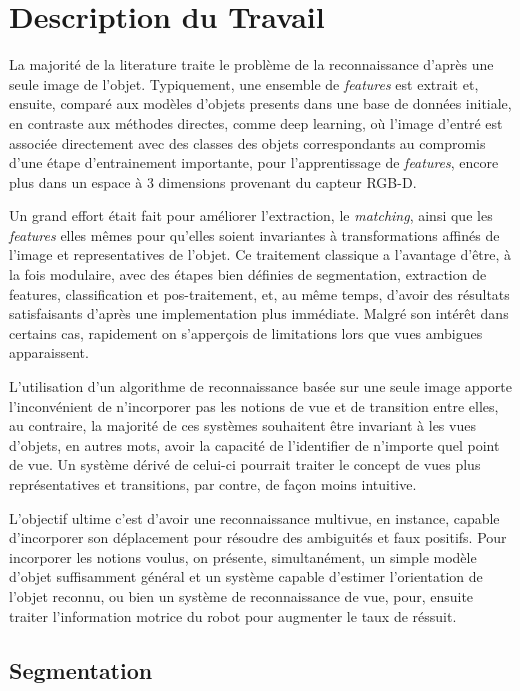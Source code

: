 
\chapter{Description du Travail}

La majorité de la literature traite le problème de la reconnaissance d'après une seule image de l'objet. Typiquement, une ensemble de \textit{features} est extrait et, ensuite, comparé aux modèles d'objets presents dans une base de données initiale, en contraste aux méthodes directes, comme deep learning, où l'image d'entré est
associée directement avec des classes des objets correspondants au
compromis d'une étape d'entrainement importante, pour l'apprentissage
de \textit{features}, encore plus dans un espace à 3 dimensions
provenant du capteur RGB-D. 

Un grand effort était fait pour améliorer l'extraction, le \textit{matching}, ainsi que les \textit{features} elles mêmes pour qu'elles soient invariantes à transformations affinés de l'image et representatives de l'objet.
Ce traitement classique a l’avantage d’être,
à la fois modulaire, avec des étapes bien définies de segmentation,
extraction de features, classification et pos-traitement, et, au même temps, d'avoir des résultats
satisfaisants d’après une implementation plus immédiate. Malgré son intérêt dans certains cas, rapidement on s'apperçois de limitations lors que vues ambigues apparaissent.

L'utilisation d'un algorithme de
reconnaissance basée sur une seule image apporte l'inconvénient de
n'incorporer pas les notions de vue et de transition entre elles, au
contraire, la majorité de ces systèmes souhaitent être invariant à les
vues d'objets, en autres mots, avoir la capacité de l'identifier de
n'importe quel point de vue. Un système dérivé de celui-ci pourrait
traiter le concept de vues plus représentatives et transitions, par
contre, de façon moins intuitive.


L'objectif ultime c'est d'avoir une reconnaissance multivue, en
instance, capable d'incorporer son déplacement pour résoudre des
ambiguités et faux positifs. Pour incorporer les notions voulus, on présente, simultanément,
un simple modèle d’objet suffisamment général et un système capable
d'estimer l'orientation de l'objet reconnu, ou bien un système de
reconnaissance de vue, pour, ensuite traiter l’information motrice du
robot pour augmenter le taux de réssuit.

\section{Segmentation}

